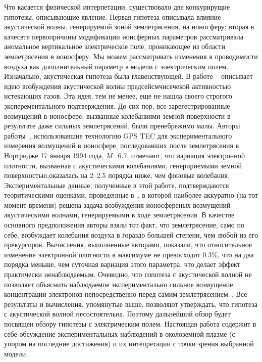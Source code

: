 \documentclass[12pt, oneside, a4paper]{article}
\begin{document}
Что касается физической интерпетации, существовало две конкурирущие гипотезы, описывающие явление. Первая гипотеза описывала влияние акустической волны, генерируемой зоной землетрясения, на ионосферу; вторая в качесвте первопричины модификации ионсферных параметров рассматривала аномальное вертикальное электрическое поле, проникающее из области землетрясения в ионосферу.  Мы можем рассматривать изменения в проводимости воздуха как дополнительный параметр в модели с электрическим полем. Изначально, акустическая гипотеза была главенствующей. В  работе ~\cite{Mareev:2002} описывает идею возбуждения акустической волны предсейсмчисечекой активностью истекающих газов. Эта идея, тем не менее, еще не нашла своего строгого эксперементального подтверждения. До сих пор, все зарегестрированные возмущений в ионосфере, вызванные колебаниями земной поверхности в результате даже сильных землетрясений, были пренебрежимо малы. Авторы работы~\cite{Calais_Minster:1995}, использовавшие технологию GPS TEC для экспериментального измерения возмущений в ионосфере, последовавших после землетрясения в Нортридже 17 января 1994 года, \emph{M}=6.7, отмечают, что вариация электронной плотности, вызванная с акустическими колебаниями, генеририемыми земной поверхностью,оказалась на 2--2.5 порядка ниже, чем фоновые колебания. Экспериментальные данные, полученные в этой работе, подтверждаются теоритическими оценками, проведенные в~\cite{Davies_Archambeau:1998}, в которой наиболее аккуратно (на тот момент времени) решена задача возбуждения ионосференых возмущений акустическими волнами, генерируемыми в ходе землетрясения. В качестве основного предположения авторы взяли тот факт, что землетрясение, само по себе, возбуждает колебания воздуха в гораздо большей степени, чем любой из его прекурсоров. Вычисления, выполненные авторами, показали, что относительное изменение электронной плотности в максимуме не превосходит $0.3\%$, что на два порядка меньше, чем суточная вариация этого параметра, что делает эффект практически ненаблюдаемым. Очевидно, что гипотеза с акустической волной не позволяет объяснить наблюдаемое экспериментально сильное возмущение концентрации электронов непосредственно перед самим землетрясением~\cite{Lui:2004}. Все результаты и вычисления, упомянутые выше, позволяют утверждать, что гипотеза с акустической волной несостоятельна. Поэтому дальнейший обзор будет посвящен обзору гипотезы с электрическим полем. Настоящая работа содержит в себе обсуждение экспериментальных наблюдений в околоземной плазме (с упором на последние достижения) и их интепретации с точки зрения выбранной модели.
\end{document}
